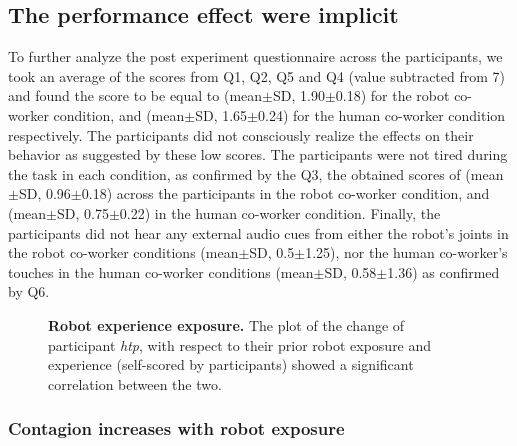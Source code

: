 \subsection{The performance effect were implicit} \label{questionnaire}

To further analyze the post experiment questionnaire across the participants, we took an average of the scores from Q1, Q2, Q5 and Q4 (value subtracted from 7) and found the score to be equal to (mean$\pm$SD, 1.90$\pm$0.18) for the robot co-worker condition, and (mean$\pm$SD, 1.65$\pm$0.24) for the human co-worker condition respectively. The participants did not consciously realize the effects on their behavior as suggested by these low scores. The participants were not tired during the task in each condition, as confirmed by the Q3, the obtained scores of (mean$\pm$SD, 0.96$\pm$0.18) across the participants in the robot co-worker condition, and (mean$\pm$SD, 0.75$\pm$0.22) in the human co-worker condition. Finally, the participants did not hear any external audio cues from either the robot's joints in the robot co-worker conditions (mean$\pm$SD, 0.5$\pm$1.25), nor the human co-worker's touches in the human co-worker conditions (mean$\pm$SD, 0.58$\pm$1.36) as confirmed by Q6.


\begin{figure}[hptb]
	\caption{{\bf Robot experience exposure.} The plot of the change of participant {\it htp}, with respect to their prior robot exposure and experience (self-scored by participants) showed a significant correlation between the two.}
	\label{fig:corelation}
\end{figure}


\subsubsection{Contagion increases with robot exposure}


